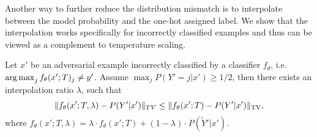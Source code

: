 

    Another way to further reduce the distribution mismatch is to interpolate between the model probability and the one-hot assigned label.
    We show that the interpolation works specifically for incorrectly classified examples and thus can be viewed as a complement to temperature scaling.
    \begin{theorem}
    \label{theorem: model-probability-coefficient}
        Let $x'$ be an adversarial example incorrectly classified by a classifier $f_\theta$, i.e. $\operatorname*{arg\,max}_j f_\theta(x'; T)_j \ne y'$. %
        Assume $\max_j P(Y'=j|x') \ge 1/2$, then there exists an interpolation ratio $\lambda$, such that
        \begin{equation*}
        \small
         \| f_\theta(x'; T, \lambda) - P(Y' | x') \|_{TV} \le \| f_\theta(x'; T) - P(Y' | x')\|_{\text{TV}},
        \normalsize
        \end{equation*}
        where $f_\theta(x'; T, \lambda) = \lambda \cdot f_\theta(x'; T) + (1 - \lambda)\cdot P(\tilde{Y}' | x')$.
    \end{theorem}
    
